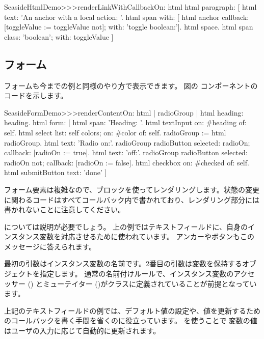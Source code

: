 \documentclass[a4paper,10pt,twoside]{book}
\begin{document}
\begin{code}{}
SeasideHtmlDemo>>>renderLinkWithCallbackOn: html 
	html paragraph: [
		html text: 'An anchor with a local action: '.
		html span with: [
			html anchor
				callback: [toggleValue := toggleValue not];
				with: 'toggle boolean:'].
		html space.
		html span
			class: 'boolean';
			with: toggleValue ]
\end{code}


\subsection{フォーム}

フォームも今までの例と同様のやり方で表示できます。
図の コンポーネントのコードを示します。

\begin{code}{}
SeasideFormDemo>>>renderContentOn: html
	| radioGroup |
	html heading: heading.
	html form: [
		html span: 'Heading: '.
		html textInput on: #heading of: self.
		html select
			list: self colors;
			on: #color of: self.
		radioGroup := html radioGroup.
		html text: 'Radio on:'.
		radioGroup radioButton
			selected: radioOn;
			callback: [radioOn := true].
		html text: 'off:'.
		radioGroup radioButton
			selected: radioOn not;
			callback: [radioOn := false].
		html checkbox on: #checked of: self.
		html submitButton
			text: 'done' ]
\end{code}{}

フォーム要素は複雑なので、ブロックを使ってレンダリングします。状態の変更に関わるコードはすべてコールバック内で書かれており、レンダリング部分には書かれないことに注意してください。

 については説明が必要でしょう。
上の例ではテキストフィールドに、自身のインスタンス変数を対応させるために使われています。
アンカーやボタンもこのメッセージに答えられます。

最初の引数はインスタンス変数の名前です。2番目の引数は変数を保持するオブジェクトを指定します。
通常の名前付けルールで、インスタンス変数のアクセッサー () とミューテイター ()がクラスに定義されていることが前提となっています。

上記のテキストフィールドの例では、デフォルト値の設定や、値を更新するためのコールバックを書く手間を省くのに役立っています。 を使うことで  変数の値はユーザの入力に応じて自動的に更新されます。
\end{document}
